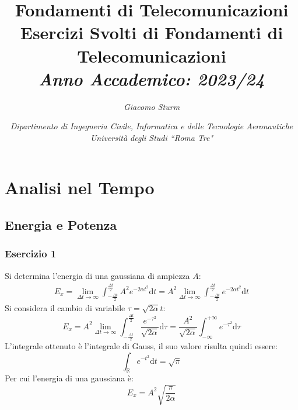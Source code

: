 \documentclass{article}
\newcommand{\df}{\mathrm{d}}
\begin{document}
\title{%
    \textbf{Fondamenti di Telecomunicazioni}  \\ 
    \large Esercizi Svolti di Fondamenti di Telecomunicazioni\\
    \textit{Anno Accademico: 2023/24}}
\author{\textit{Giacomo Sturm}}
\date{\textit{Dipartimento di Ingegneria Civile, Informatica e delle Tecnologie Aeronautiche \\
Università degli Studi ``Roma Tre"}}

\maketitle
\thispagestyle{link}


\clearpage

\pagestyle{fancy}
\fancyhead{}\fancyfoot{}
\fancyfoot[C]{\thepage}

\tableofcontents

\clearpage


\section{Analisi nel Tempo}

\subsection{Energia e Potenza}

\subsubsection*{Esercizio 1}

Si determina l'energia di una gaussiana di ampiezza $A$:
\begin{gather*}
    E_x=\lim_{\Delta t\to\infty}\displaystyle\int_{-\frac{\Delta t}{2}}^{\frac{\Delta t}{2}}A^2e^{-2\alpha t^2}\df t=A^2\lim_{\Delta t\to\infty}\displaystyle\int_{-\frac{\Delta t}{2}}^{\frac{\Delta t}{2}}e^{-2\alpha t^2}\df t
\end{gather*}
Si considera il cambio di variabile $\tau=\sqrt{2\alpha}t$:
\begin{equation*}
    E_x=A^2\lim_{\Delta t\to\infty}\displaystyle\int_{-\frac{\Delta t}{2}}^{\frac{\Delta t}{2}}\frac{e^{-\tau^2}}{\sqrt{2\alpha}}\df\tau=\frac{A^2}{\sqrt{2\alpha}}\int_{-\infty}^{+\infty}e^{-\tau^2}\df\tau
\end{equation*}
L'integrale ottenuto è l'integrale di Gauss, il suo valore risulta quindi essere: 
\begin{equation*}
    \displaystyle\int_{\mathbb{R}}e^{-t^2}\df t=\sqrt\pi
\end{equation*}
Per cui l'energia di una gaussiana è:
\begin{equation}
    E_x=A^2\displaystyle\sqrt{\frac{\pi}{2\alpha}}
\end{equation}
\end{document}
